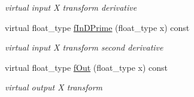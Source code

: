 \begin{DoxyCompactItemize}
\begin{DoxyCompactList}\small\item\em virtual input X transform derivative \end{DoxyCompactList}\item 
\hypertarget{classc2__transformation_a54a2e8100a32c033ceb40b3ef0783b28}{virtual float\-\_\-type \hyperlink{classc2__transformation_a54a2e8100a32c033ceb40b3ef0783b28}{f\-In\-D\-Prime} (float\-\_\-type x) const }\label{classc2__transformation_a54a2e8100a32c033ceb40b3ef0783b28}

\begin{DoxyCompactList}\small\item\em virtual input X transform second derivative \end{DoxyCompactList}\item 
\hypertarget{classc2__transformation_a5f0763a91e99b1abc5bd227a2cf19ceb}{virtual float\-\_\-type \hyperlink{classc2__transformation_a5f0763a91e99b1abc5bd227a2cf19ceb}{f\-Out} (float\-\_\-type x) const }\label{classc2__transformation_a5f0763a91e99b1abc5bd227a2cf19ceb}

\begin{DoxyCompactList}\small\item\em virtual output X transform \end{DoxyCompactList}\end{DoxyCompactItemize}
